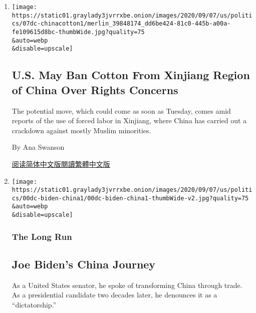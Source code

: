 \begin{enumerate}
\def\labelenumi{\arabic{enumi}.}
\item
  \href{/2020/09/07/business/economy/us-china-xinjiang-cotton-ban.html}{}

  \texttt{[image: https://static01.graylady3jvrrxbe.onion/images/2020/09/07/us/politics/07dc-chinacotton1/merlin\_39848174\_dd6be424-81c0-445b-a00a-fe109615d8bc-thumbWide.jpg?quality=75\\\&auto=webp\\\&disable=upscale]}

  \hypertarget{us-may-ban-cotton-from-xinjiang-region-of-china-over-rights-concerns}{%
  \subsection{U.S. May Ban Cotton From Xinjiang Region of China Over
  Rights
  Concerns}\label{us-may-ban-cotton-from-xinjiang-region-of-china-over-rights-concerns}}

  The potential move, which could come as soon as Tuesday, comes amid
  reports of the use of forced labor in Xinjiang, where China has
  carried out a crackdown against mostly Muslim minorities.

  By Ana Swanson

  \href{https://cn.nytimes3xbfgragh.onion/usa/20200908/us-china-xinjiang-cotton-ban/}{阅读简体中文版}\href{https://cn.nytimes3xbfgragh.onion/usa/20200908/us-china-xinjiang-cotton-ban/zh-hant/}{閱讀繁體中文版}
\item
  \href{/2020/09/06/us/politics/biden-china.html}{}

  \texttt{[image: https://static01.graylady3jvrrxbe.onion/images/2020/09/07/us/politics/00dc-biden-china1/00dc-biden-china1-thumbWide-v2.jpg?quality=75\\\&auto=webp\\\&disable=upscale]}

  \hypertarget{the-long-run}{%
  \subsubsection{The Long Run}\label{the-long-run}}

  \hypertarget{joe-bidens-china-journey}{%
  \subsection{Joe Biden's China
  Journey}\label{joe-bidens-china-journey}}

  As a United States senator, he spoke of transforming China through
  trade. As a presidential candidate two decades later, he denounces it
  as a ``dictatorship.''


\end{enumerate}

